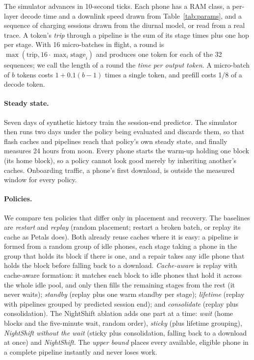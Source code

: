 \documentclass[sigconf,nonacm]{acmart}
\begin{document}
The simulator advances in 10-second ticks. Each phone has a RAM class, a
per-layer decode time and a downlink speed drawn from Table~\ref{tab:params},
and a sequence of charging sessions drawn from the diurnal model, or read from
a real trace. A token's \emph{trip} through a pipeline is the sum of its stage
times plus one hop per stage. With 16 micro-batches in flight, a round is
$\max(\text{trip}, 16\cdot\max_i \text{stage}_i)$ and produces one token for
each of the 32 sequences; we call the length of a round the \emph{time per
output token}. A micro-batch of $b$ tokens costs
$1+0.1(b-1)$ times a single token, and prefill costs 1/8 of a decode token.

\paragraph{Steady state.} Seven days of synthetic history train the session-end
predictor. The simulator then runs two days under the policy being evaluated
and discards them, so that flash caches and pipelines reach that policy's own
steady state, and finally measures 24 hours from noon. Every phone starts the
warm-up holding one block (its home block), so a policy cannot look good merely
by inheriting another's caches. Onboarding traffic, a phone's first download,
is outside the measured window for every policy.

\paragraph{Policies.} We compare ten policies that differ only in placement and
recovery. The baselines are \emph{restart} and \emph{replay} (random placement;
restart a broken batch, or replay its cache as Petals does). Both already
reuse caches where it is easy: a pipeline is formed from a random group of
idle phones, each stage taking a phone in the group that holds its block if
there is one, and a repair takes any idle phone that holds the block before
falling back to a download. \emph{Cache-aware} is replay with cache-aware
formation: it matches each block to idle phones that hold it across the whole
idle pool, and only then fills the remaining stages from the rest (it never
waits); \emph{standby} (replay plus one warm standby per stage);
\emph{lifetime} (replay with pipelines grouped by predicted session end); and
\emph{consolidate} (replay plus consolidation). The NightShift ablation adds
one part at a time: \emph{wait} (home blocks and the five-minute wait, random
order), \emph{sticky} (plus lifetime grouping), \emph{NightShift without the
wait} (sticky plus consolidation, falling back to a download at once) and
\emph{NightShift}. The \emph{upper bound} places every available, eligible
phone in a complete pipeline instantly and never loses work.
\end{document}
